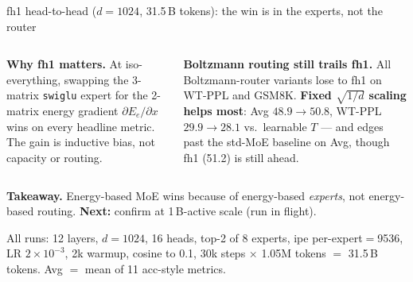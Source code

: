 \documentclass[aspectratio=169,10pt]{beamer}
\begin{document}
\begin{frame}{fh1 head-to-head ($d{=}1024$, 31.5\,B tokens): the win is in the experts, not the router}
\vspace{-2pt}
\begin{columns}[T,onlytextwidth]
\begin{wintile}
\textbf{Why fh1 matters.}
At iso-everything, swapping the 3-matrix \texttt{swiglu} expert for the
2-matrix energy gradient $\partial E_e/\partial x$ wins on every headline
metric. The gain is inductive bias, not capacity or routing.
\end{wintile}

\begin{accenttile}
\textbf{Boltzmann routing still trails fh1.}
All Boltzmann-router variants lose to fh1 on WT-PPL and GSM8K.
\textbf{Fixed $\sqrt{1/d}$ scaling helps most}: Avg $48.9{\to}50.8$,
WT-PPL $29.9{\to}28.1$ vs.\ learnable $T$ --- and edges past the std-MoE
baseline on Avg, though fh1 (51.2) is still ahead.
\end{accenttile}

\end{columns}

\vspace{2pt}
\begin{egpttile}
\textbf{Takeaway.}
Energy-based MoE wins because of energy-based \emph{experts}, not energy-based routing.
\textbf{Next:} confirm at 1\,B-active scale (run in flight).
\end{egpttile}

\vspace{1pt}
{\sffamily\tiny\color{cTextSec}\hfill
All runs: 12 layers, $d{=}1024$, 16 heads, top-2 of 8 experts, ipe per-expert$=$9536,
LR $2{\times}10^{-3}$, 2k warmup, cosine to 0.1, 30k steps $\times$ 1.05M tokens
$=$ 31.5\,B tokens. \;
Avg $=$ mean of 11 acc-style metrics. \;
\hfill\hfill}

\end{frame}
\end{document}

